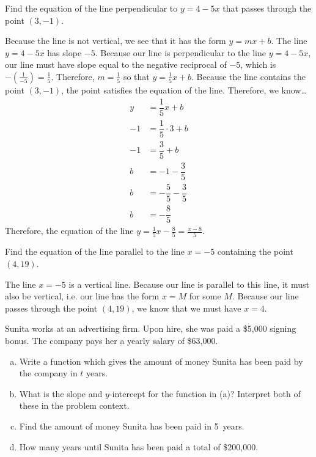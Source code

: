 \documentclass[11pt,letterpaper]{article}
\begin{document}
\newpage



 Find the equation of the line perpendicular to $y= 4 - 5x$ that passes through the point $(3, -1)$. \pspace

\sol Because the line is not vertical, we see that it has the form $y= mx + b$. The line $y= 4 - 5x$ has slope $-5$. Because our line is perpendicular to the line $y= 4 - 5x$, our line must have slope equal to the negative reciprocal of $-5$, which is $-(\frac{1}{-5})= \frac{1}{5}$. Therefore, $m= \frac{1}{5}$ so that $y= \frac{1}{5}x + b$. Because the line contains the point $(3, -1)$, the point satisfies the equation of the line. Therefore, we know\dots
	\[
	\begin{aligned}
	y&= \dfrac{1}{5}x + b \\[0.3cm]
	-1&= \dfrac{1}{5} \cdot 3 + b \\[0.3cm]
	-1&= \dfrac{3}{5} + b \\[0.3cm]
	b&= -1 - \dfrac{3}{5} \\[0.3cm] 
	b&= -\dfrac{5}{5} - \dfrac{3}{5} \\[0.3cm]
	b&= -\dfrac{8}{5}
	\end{aligned}
	\]
Therefore, the equation of the line $y= \frac{1}{5} x - \frac{8}{5}= \frac{x - 8}{5}$. 



\newpage



 Find the equation of the line parallel to the line $x= -5$ containing the point $(4, 19)$. \pspace

\sol The line $x= -5$ is a vertical line. Because our line is parallel to this line, it must also be vertical, i.e. our line has the form $x= M$ for some $M$. Because our line passes through the point $(4, 19)$, we know that we must have $x= 4$. 



\newpage



 Sunita works at an advertising firm. Upon hire, she was paid a \$5,000 signing bonus. The company pays her a yearly salary of \$63,000. 
        \begin{enumerate}[(a)]
        \item Write a function which gives the amount of money Sunita has been paid by the company in $t$ years. 
        \item What is the slope and $y$-intercept for the function in (a)? Interpret both of these in the problem context. 
        \item Find the amount of money Sunita has been paid in 5~years.
        \item How many years until Sunita has been paid a total of \$200,000. 
        \end{enumerate} \pspace
\end{document}
